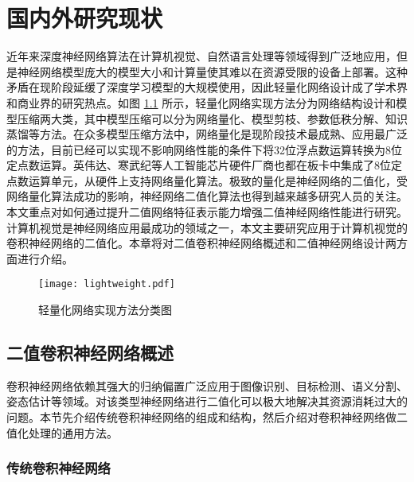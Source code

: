 
\chapter{国内外研究现状}

近年来深度神经网络算法在计算机视觉、自然语言处理等领域得到广泛地应用，但是神经网络模型庞大的模型大小和计算量使其难以在资源受限的设备上部署。这种矛盾在现阶段延缓了深度学习模型的大规模使用，因此轻量化网络设计成了学术界和商业界的研究热点。如图 \ref{fig:lightweight} 所示，轻量化网络实现方法分为网络结构设计\cite{mobilenet,squeezenet,shufflenet}和模型压缩两大类，其中模型压缩可以分为网络量化\cite{yan2020accurate,wang2020apq,cai2020zeroq}、模型剪枝\cite{han2015learning,he2017channel}、参数低秩分解\cite{denton2014exploiting,lebedev2016fast}、知识蒸馏\cite{hinton2015distilling,dai2021general,du2022distilling}等方法。在众多模型压缩方法中，网络量化是现阶段技术最成熟、应用最广泛的方法，目前已经可以实现不影响网络性能的条件下将32位浮点数运算转换为8位定点数运算。英伟达、寒武纪等人工智能芯片硬件厂商也都在板卡中集成了8位定点数运算单元，从硬件上支持网络量化算法。极致的量化是神经网络的二值化，受网络量化算法成功的影响，神经网络二值化算法也得到越来越多研究人员的关注。本文重点对如何通过提升二值网络特征表示能力增强二值神经网络性能进行研究。计算机视觉是神经网络应用最成功的领域之一，本文主要研究应用于计算机视觉的卷积神经网络的二值化。本章将对二值卷积神经网络概述和二值神经网络设计两方面进行介绍。

\begin{figure}[htb]
  \vspace{6pt}
  \centering
  \texttt{[image: lightweight.pdf]}
  \caption{轻量化网络实现方法分类图}
  \label{fig:lightweight}
\end{figure}

\section{二值卷积神经网络概述}

卷积神经网络依赖其强大的归纳偏置广泛应用于图像识别、目标检测、语义分割、姿态估计等领域。对该类型神经网络进行二值化可以极大地解决其资源消耗过大的问题。本节先介绍传统卷积神经网络的组成和结构，然后介绍对卷积神经网络做二值化处理的通用方法。

\subsection{传统卷积神经网络}

